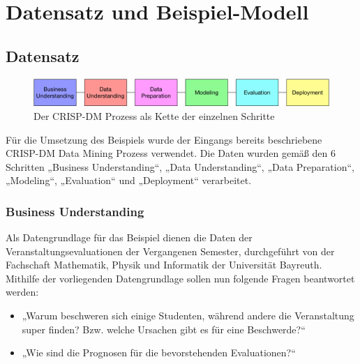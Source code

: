 %


%
%
\chapter{Datensatz und Beispiel-Modell}
\label{sec:example}

\section{Datensatz}
\label{sec:example:data}

\begin{figure}[htb]
	\includegraphics[width=\textwidth]{gfx/crisplinear.png}
	\caption{Der CRISP-DM Prozess als Kette der einzelnen Schritte}
	\label{fig:example:data:crisp}
\end{figure}

Für die Umsetzung des Beispiels wurde der Eingangs bereits beschriebene CRISP-DM
Data Mining Prozess verwendet. Die Daten wurden gemäß den 6 Schritten „Business
Understanding“, „Data Understanding“, „Data Preparation“, „Modeling“,
„Evaluation“ und „Deployment“ verarbeitet.

\subsection{Business Understanding}
\label{sec:example:data:bu}

Als Datengrundlage für das Beispiel dienen die Daten der
Veranstaltungsevaluationen der Vergangenen Semester, durchgeführt von der
Fachschaft Mathematik, Physik und Informatik der Universität Bayreuth. Mithilfe
der vorliegenden Datengrundlage sollen nun folgende Fragen beantwortet werden:

\begin{itemize}
  \item „Warum beschweren sich einige Studenten, während andere die Veranstaltung
  super finden? Bzw. welche Ursachen gibt es für eine Beschwerde?“
  \item „Wie sind die Prognosen für die bevorstehenden Evaluationen?“
\end{itemize}

